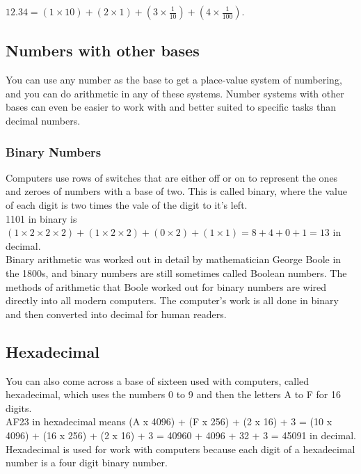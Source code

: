 \documentclass{article}
\begin{document}
$12.34 = (1 \times 10) + (2 \times 1) + (3 \times \frac{1}{10}) + (4 \times \frac{1}{100}).$

\newpage

\subsection*{Numbers with other bases}

You can use any number as the base to get a place-value system of numbering, and you can do arithmetic in any of these systems. Number systems with other bases can even be easier to work with and better suited to specific tasks than decimal numbers.

\subsubsection*{Binary Numbers}
Computers use rows of switches that are either off or on to represent the ones and zeroes of numbers with a base of two. This is called binary, where the value of each digit is two times the vale of the digit to it’s left.\\

1101 in binary is $(1 \times 2 \times 2 \times 2) + (1 \times 2 \times 2) + (0 \times 2) + (1 \times 1) = 8 + 4 + 0 + 1 = 13$ in decimal.\\

Binary arithmetic was worked out in detail by mathematician George Boole in the 1800s, and binary numbers are still sometimes called Boolean numbers. The methods of arithmetic that Boole worked out for binary numbers are wired directly into all modern computers. The computer's work is all done in binary and then converted into decimal for human readers.

\newpage

\subsection*{Hexadecimal}
You can also come across a base of sixteen used with computers, called hexadecimal, which uses the numbers 0 to 9 and then the letters A to F for 16 digits.\\

AF23 in hexadecimal means	(A x 4096) + (F x 256) + (2 x 16) + 3
= (10 x 4096) + (16 x 256) + (2 x 16) + 3
= 40960 + 4096 + 32 + 3
= 45091 in decimal.\\

Hexadecimal is used for work with computers because each digit of a hexadecimal number is a four digit binary number.\\
\end{document}
